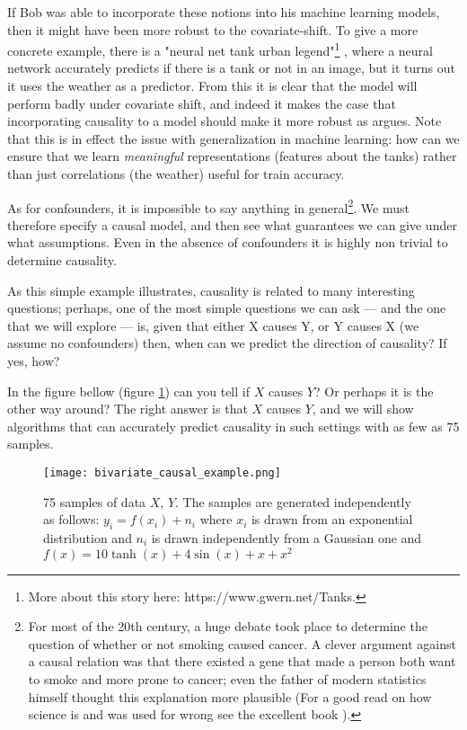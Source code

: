 If Bob was able to incorporate these notions into his machine learning models, then it might have been more
robust to the covariate-shift. To give a more concrete example, there is a "neural net tank urban legend"\footnote{
    More about this story here: https://www.gwern.net/Tanks.
}
, where a neural network accurately predicts if there is a tank or not in an image, but it turns out it uses the 
weather as a predictor. From this it is clear that the model will perform badly under covariate shift, and indeed
it makes the case that incorporating causality to a model should make it more robust as
\cite{scholkopf2019causality} argues. Note that this is in effect the issue with generalization in machine learning:
how can we ensure that we learn \textit{meaningful} representations (features about the tanks) rather than just
correlations (the weather) useful for train accuracy. 

As for confounders, it is impossible to say anything in general\footnote{
    For most of the 20th century, a huge debate took place to determine the question of whether or not 
    smoking caused cancer. A clever argument against a causal relation was that there existed a gene that 
    made a person both want to smoke and more prone to cancer; even the father of modern statistics
    himself thought this explanation more plausible (For a good read on how science is and was used 
    for wrong see the excellent book \cite{NaomiMerchants}).
    
}. We must therefore specify a causal model, and
then see what guarantees we can give under what assumptions. Even in the absence of confounders it is highly 
non trivial to determine causality.

As this simple example illustrates, causality is related to many interesting questions; perhaps, one of the most 
simple questions we can ask --- and the one that we will explore --- is, given that either X causes Y, or Y causes X
(we assume no confounders) then, when 
can we predict the direction of causality? If yes, how? 

In the figure bellow (figure \ref{fig:simple_bivariate_example}) can you tell if $X$ causes $Y$? Or perhaps
it is the other way around? The right answer is that $X$ causes $Y$, and we will show algorithms that 
can accurately predict causality in such settings with as few as 75 samples. 

\begin{figure}[H]
    \centering
    \texttt{[image: bivariate\_causal\_example.png]}
    \caption{75 samples of data $X$, $Y$.  The samples are generated independently as follows:
    $y_i = f(x_i) + n_i$ where $x_i$ is drawn from an exponential distribution and $n_i$ is drawn 
    independently from a Gaussian one and $f(x) = 10 \tanh(x) + 4\sin(x) + x + x^2$}
    \label{fig:simple_bivariate_example}
\end{figure}

